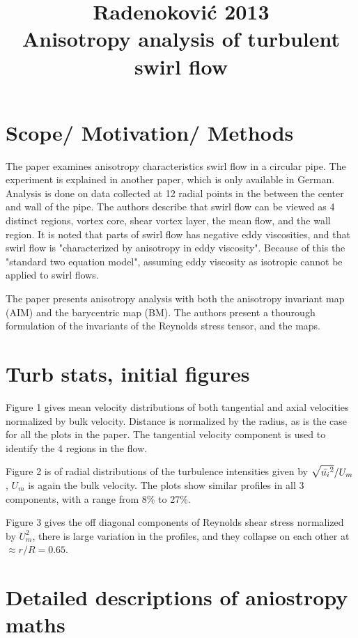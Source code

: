 \documentclass{article}
\title{Radenokovi\'c 2013 \\ Anisotropy analysis of turbulent swirl flow}
\date{}
\begin{document}
\maketitle

\section*{Scope/ Motivation/ Methods}

The paper examines anisotropy characteristics swirl flow in a circular pipe. The experiment is explained in another paper, which is only available in German. Analysis is done on data collected at 12 radial points in the between the center and wall of the pipe. The authors describe that swirl flow can be viewed as 4 distinct regions, vortex core, shear vortex layer, the mean flow\footnotemark, and the wall region. It is noted that parts of swirl flow has negative eddy viscosities, and that swirl flow is "characterized by anisotropy in eddy viscosity". Because of this the "standard two equation model", assuming eddy viscosity as isotropic cannot be applied to swirl flows. 

The paper presents anisotropy analysis with both the anisotropy invariant map (AIM) and the barycentric map (BM). The authors present a thourough formulation of the invariants of the Reynolds stress tensor, and the maps.

\section*{Turb stats, initial figures}
Figure 1 gives mean velocity distributions of both tangential and axial velocities normalized by bulk velocity. Distance is normalized by the radius, as is the case for all the plots in the paper. The tangential velocity component is used to identify the 4 regions in the flow. 

Figure 2 is of radial distributions of the turbulence intensities given by $\sqrt{\Bar{u_i}^2}/U_m$, $U_m$ is again the bulk velocity. The plots show similar profiles in all 3 components, with a range from 8\% to 27\%.

Figure 3 gives the off diagonal components of Reynolds shear stress normalized by $U_m^2$, there is large variation in the profiles, and they collapse on each other at $\approx r/R = 0.65$.

\section*{Detailed descriptions of aniostropy maths}



\end{document}
